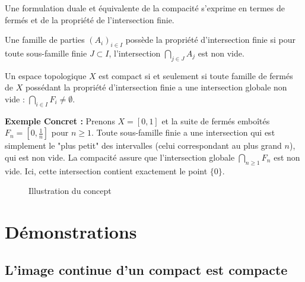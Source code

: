 \documentclass[11pt,a4paper]{article}
\begin{document}
Une formulation duale et équivalente de la compacité s'exprime en termes de fermés et de la propriété de l'intersection finie.

Une famille de parties $(A_i)_{i \in I}$ possède la propriété d'intersection finie si pour toute sous-famille finie $J \subset I$, l'intersection $\bigcap_{j \in J} A_j$ est non vide.

Un espace topologique $X$ est compact si et seulement si toute famille de fermés de $X$ possédant la propriété d'intersection finie a une intersection globale non vide : $\bigcap_{i \in I} F_i \neq \emptyset$.

\textbf{Exemple Concret :}
Prenons $X = [0, 1]$ et la suite de fermés emboîtés $F_n = \left[ 0, \frac{1}{n} \right]$ pour $n \ge 1$. Toute sous-famille finie a une intersection qui est simplement le "plus petit" des intervalles (celui correspondant au plus grand $n$), qui est non vide. La compacité assure que l'intersection globale $\bigcap_{n \ge 1} F_n$ est non vide. Ici, cette intersection contient exactement le point $\{0\}$.

\begin{figure}[h!]
\centering
{}
\caption{Illustration du concept}
\end{figure}

\section{Démonstrations}

\subsection{L'image continue d'un compact est compacte}
\end{document}
